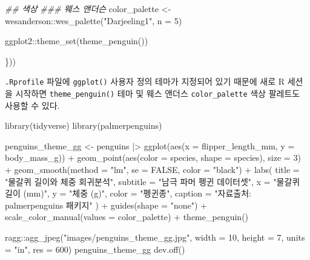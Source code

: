\documentclass[
  letterpaper,
]{book}
\newenvironment{Shaded}{\begin{snugshade}}{\end{snugshade}}
\newcommand{\AttributeTok}[1]{\textcolor[rgb]{0.40,0.45,0.13}{#1}}
\newcommand{\ConstantTok}[1]{\textcolor[rgb]{0.56,0.35,0.01}{#1}}
\newcommand{\DecValTok}[1]{\textcolor[rgb]{0.68,0.00,0.00}{#1}}
\newcommand{\DocumentationTok}[1]{\textcolor[rgb]{0.37,0.37,0.37}{\textit{#1}}}
\newcommand{\FunctionTok}[1]{\textcolor[rgb]{0.28,0.35,0.67}{#1}}
\newcommand{\NormalTok}[1]{\textcolor[rgb]{0.00,0.23,0.31}{#1}}
\newcommand{\OtherTok}[1]{\textcolor[rgb]{0.00,0.23,0.31}{#1}}
\newcommand{\SpecialCharTok}[1]{\textcolor[rgb]{0.37,0.37,0.37}{#1}}
\newcommand{\StringTok}[1]{\textcolor[rgb]{0.13,0.47,0.30}{#1}}
\begin{document}
\begin{Shaded}
\begin{Highlighting}[]
  \DocumentationTok{\#\# 색상}
  \DocumentationTok{\#\#\# 웨스 앤더슨}
\NormalTok{  color\_palette }\OtherTok{\textless{}{-}}\NormalTok{ wesanderson}\SpecialCharTok{::}\FunctionTok{wes\_palette}\NormalTok{(}\StringTok{"Darjeeling1"}\NormalTok{, }\AttributeTok{n =} \DecValTok{5}\NormalTok{)}

\NormalTok{  ggplot2}\SpecialCharTok{::}\FunctionTok{theme\_set}\NormalTok{(}\FunctionTok{theme\_penguin}\NormalTok{())}

\NormalTok{\}))}
\end{Highlighting}
\end{Shaded}

\texttt{.Rprofile} 파일에 \texttt{ggplot()} 사용자 정의 테마가 지정되어
있기 때문에 새로 R 세션을 시작하면 \texttt{theme\_penguin()} 테마 및
웨스 앤더스 \texttt{color\_palette} 색상 팔레트도 사용할 수 있다.

\begin{Shaded}
\begin{Highlighting}[]
\FunctionTok{library}\NormalTok{(tidyverse)}
\FunctionTok{library}\NormalTok{(palmerpenguins)}

\NormalTok{penguins\_theme\_gg }\OtherTok{\textless{}{-}}\NormalTok{ penguins }\SpecialCharTok{|\textgreater{}} 
  \FunctionTok{ggplot}\NormalTok{(}\FunctionTok{aes}\NormalTok{(}\AttributeTok{x =}\NormalTok{ flipper\_length\_mm, }\AttributeTok{y =}\NormalTok{ body\_mass\_g)) }\SpecialCharTok{+}
    \FunctionTok{geom\_point}\NormalTok{(}\FunctionTok{aes}\NormalTok{(}\AttributeTok{color =}\NormalTok{ species, }\AttributeTok{shape =}\NormalTok{ species), }\AttributeTok{size =} \DecValTok{3}\NormalTok{) }\SpecialCharTok{+}
    \FunctionTok{geom\_smooth}\NormalTok{(}\AttributeTok{method =} \StringTok{"lm"}\NormalTok{, }\AttributeTok{se =} \ConstantTok{FALSE}\NormalTok{, }\AttributeTok{color =} \StringTok{"black"}\NormalTok{)  }\SpecialCharTok{+}
    \FunctionTok{labs}\NormalTok{(}
      \AttributeTok{title =} \StringTok{"물갈퀴 길이와 체중 회귀분석"}\NormalTok{,}
      \AttributeTok{subtitle =} \StringTok{"남극 파머 펭귄 데이터셋"}\NormalTok{,}
      \AttributeTok{x =} \StringTok{"물갈퀴 길이 (mm)"}\NormalTok{,}
      \AttributeTok{y =} \StringTok{"체중 (g)"}\NormalTok{,}
      \AttributeTok{color =} \StringTok{"펭귄종"}\NormalTok{,}
      \AttributeTok{caption =} \StringTok{"자료출처: palmerpenguins 패키지"}
\NormalTok{    ) }\SpecialCharTok{+}
  \FunctionTok{guides}\NormalTok{(}\AttributeTok{shape =} \StringTok{"none"}\NormalTok{) }\SpecialCharTok{+}
  \FunctionTok{scale\_color\_manual}\NormalTok{(}\AttributeTok{values =}\NormalTok{  color\_palette) }\SpecialCharTok{+}
  \FunctionTok{theme\_penguin}\NormalTok{()}

\NormalTok{ragg}\SpecialCharTok{::}\FunctionTok{agg\_jpeg}\NormalTok{(}\StringTok{"images/penguins\_theme\_gg.jpg"}\NormalTok{,}
              \AttributeTok{width =} \DecValTok{10}\NormalTok{, }\AttributeTok{height =} \DecValTok{7}\NormalTok{, }\AttributeTok{units =} \StringTok{"in"}\NormalTok{, }\AttributeTok{res =} \DecValTok{600}\NormalTok{)}
\NormalTok{penguins\_theme\_gg}
\FunctionTok{dev.off}\NormalTok{()}
\end{Highlighting}
\end{Shaded}
\end{document}
